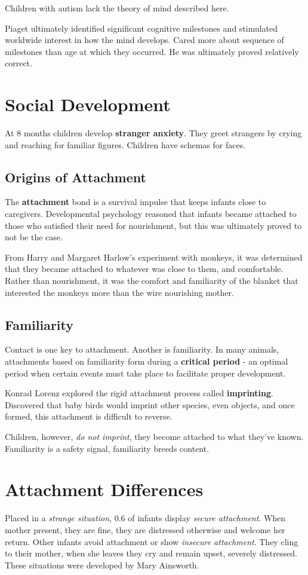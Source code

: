 \documentclass[12pt]{article}
\begin{document}
Children with autism lack the theory of mind described here.

Piaget ultimately identified significant cognitive milestones and stimulated worldwide interest in how the mind develops. Cared more about sequence of milestones than age at which they occurred. He was ultimately proved relatively correct.

\section*{Social Development}

At 8 months children develop \textbf{stranger anxiety}. They greet strangers by crying and reaching for familiar figures. Children have schemas for faces.

\subsection*{Origins of Attachment}

The \textbf{attachment} bond is a survival impulse that keeps infants close to caregivers. Developmental psychology reasoned that infants became attached to those who satisfied their need for nourishment, but this was ultimately proved to not be the case.

From Harry and Margaret Harlow's experiment with monkeys, it was determined that they became attached to whatever was close to them, and comfortable. Rather than nourishment, it was the comfort and familiarity of the blanket that interested the monkeys more than the wire nourishing mother.

\subsection*{Familiarity}
Contact is one key to attachment. Another is familiarity. In many animals, attachments based on familiarity form during a \textbf{critical period} - an optimal period when certain events must take place to facilitate proper development.

Konrad Lorenz explored the rigid attachment process called \textbf{imprinting}. Discovered that baby birds would imprint other species, even objects, and once formed, this attachment is difficult to reverse.

Children, however, \textit{do not imprint}, they become attached to what they've known. Familiarity is a safety signal, familiarity breeds content.

\section*{Attachment Differences}
Placed in a \textit{strange situation}, 0.6 of infants display \textit{secure attachment}. When mother present, they are fine, they are distressed otherwise and welcome her return. Other infants avoid attachment or show \textit{insecure attachment}. They cling to their mother, when she leaves they cry and remain upset, severely distressed. These situations were developed by Mary Ainsworth. 
\end{document}
